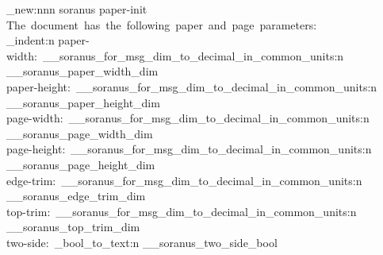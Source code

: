 %

\msg_new:nnn { soranus } { paper-init }
  {
    The~document~has~the~following~paper~and~page~parameters:\\
    \iow_indent:n
      {
        paper-width:~\__soranus_for_msg_dim_to_decimal_in_common_units:n
          { \g__soranus_paper_width_dim }\\
        paper-height:~\__soranus_for_msg_dim_to_decimal_in_common_units:n
          { \g__soranus_paper_height_dim }\\
        page-width:~\__soranus_for_msg_dim_to_decimal_in_common_units:n
          { \g__soranus_page_width_dim }\\
        page-height:~\__soranus_for_msg_dim_to_decimal_in_common_units:n
          { \g__soranus_page_height_dim }\\
        edge-trim:~\__soranus_for_msg_dim_to_decimal_in_common_units:n
          { \g__soranus_edge_trim_dim }\\
        top-trim:~\__soranus_for_msg_dim_to_decimal_in_common_units:n
          { \g__soranus_top_trim_dim }\\
        two-side:~\soranus_bool_to_text:n { \g__soranus_two_side_bool }
      }
  }


